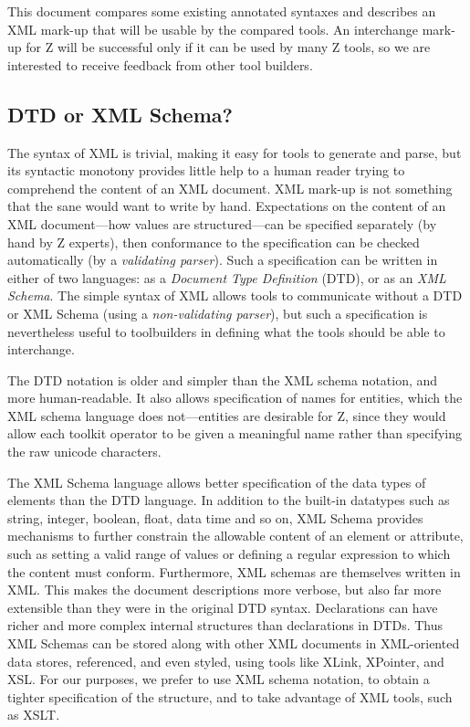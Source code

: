 \documentclass{llncs}  %
\begin{document}
This document compares some existing annotated syntaxes
and describes an XML mark-up that will be usable by the compared tools.
An interchange mark-up for Z will be successful only if
it can be used by many Z tools, so we are interested to 
receive feedback from other tool builders.


\subsection{DTD or XML Schema?}

The syntax of XML\cite{XML} is trivial,
making it easy for tools to generate and parse,
but its syntactic monotony provides little help to a human reader
trying to comprehend the content of an XML document.
XML mark-up is not something that the sane would want to write by hand.
Expectations on the content of an XML document---how values are
structured---can be specified separately (by hand by Z experts),
then conformance to the specification can be checked automatically
(by a \textit{validating parser}).
Such a specification can be written in either of two languages:
as a \textit{Document Type Definition} (DTD), or as an \textit{XML Schema}.
The simple syntax of XML allows tools to communicate
without a DTD or XML Schema (using a \textit{non-validating parser}),
but such a specification is nevertheless useful to toolbuilders
in defining what the tools should be able to interchange.

The DTD notation is older and simpler than the XML schema notation,
and more human-readable.  It also allows specification of names for
entities, which the XML schema language does not---entities are
desirable for Z, since they would allow each toolkit operator to be
given a meaningful name rather than specifying the raw unicode characters.

The XML Schema language allows better specification of the data types
of elements than the DTD language. In addition to the built-in
datatypes such as string, integer, boolean, float, data time and so
on, XML Schema provides mechanisms to further constrain the allowable
content of an element or attribute, such as setting a valid range of
values or defining a regular expression to which the content must
conform. Furthermore, XML schemas are themselves written in XML.  This
makes the document descriptions more verbose, but also far more
extensible than they were in the original DTD syntax. Declarations can
have richer and more complex internal structures than declarations in
DTDs. Thus XML Schemas can be stored along with other XML documents in
XML-oriented data stores, referenced, and even styled, using tools
like XLink, XPointer, and XSL. For our purposes, we prefer to use XML
schema notation, to obtain a tighter specification of the structure,
and to take advantage of XML tools, such as XSLT.
\end{document}
